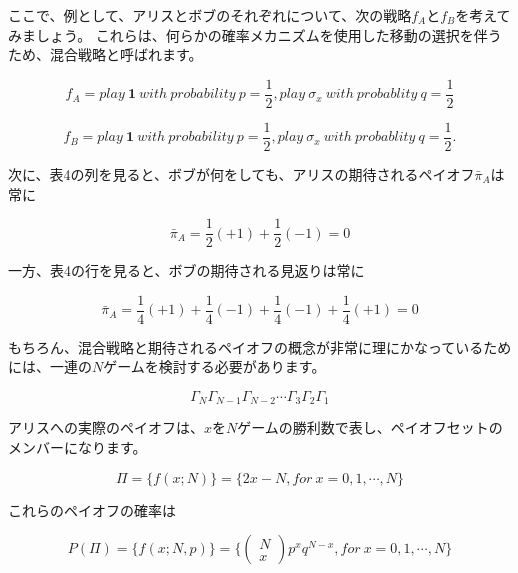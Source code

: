 ここで、例として、アリスとボブのそれぞれについて、次の戦略$f_A$と$f_B$を考えてみましょう。 これらは、何らかの確率メカニズムを使用した移動の選択を伴うため、混合戦略と呼ばれます。

\begin{equation}
\label{17}
f_A = play \ \mathbf{1} \ with \ probability  \ p = \frac{1}{2}, play \ \sigma_x \ with \ probablity \ q = \frac{1}{2}
\end{equation}


\begin{equation}
\label{18}
f_B = play \ \mathbf{1} \ with \ probability  \ p = \frac{1}{2}, play \ \sigma_x \ with \ probablity \ q = \frac{1}{2} .
\end{equation}

次に、表4の列を見ると、ボブが何をしても、アリスの期待されるペイオフ$\bar{\pi}_A$は常に

\begin{equation}
\label{19}
\bar{\pi}_A = \frac{1}{2}(+1) + \frac{1}{2}(-1)  =0
\end{equation}

一方、表4の行を見ると、ボブの期待される見返りは常に

\begin{equation}
\label{20}
\bar{\pi}_A = \frac{1}{4}(+1) + \frac{1}{4}(-1) + \frac{1}{4}(-1) + \frac{1}{4}(+1) =0
\end{equation}

もちろん、混合戦略と期待されるペイオフの概念が非常に理にかなっているためには、一連の$N$ゲームを検討する必要があります。

\begin{equation}
\label{21}
\Gamma_N \Gamma_{N-1} \Gamma_{N-2} \cdots \Gamma_{3}  \Gamma_{2} \Gamma_{1}  
\end{equation}

アリスへの実際のペイオフは、$x$を$N$ゲームの勝利数で表し、ペイオフセットのメンバーになります。

\begin{equation}
\label{22}
\Pi = \{f(x;N)\} = \{ 2x-N, for \ x = 0,1,\cdots ,N \}
\end{equation}

これらのペイオフの確率は

\begin{equation}
\label{23}
P(\Pi) = \{f(x;N,p)\} = \{ 
\left( \begin{array}{c}
N \\
x
\end{array} \right)
p^x q^{N-x}, for \ x = 0,1,\cdots ,N \}
\end{equation}

